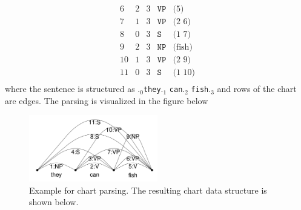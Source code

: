 \begin{itemize}
$$\begin{array}{ccccc}
	6 & 2 & 3 & \texttt{VP} & \text{(5)}\\
	7 & 1 & 3 & \texttt{VP} & \text{(2 6)}\\
	8 & 0 & 3 & \texttt{S} & \text{(1 7)}\\
	9 & 2 & 3 & \texttt{NP} & \text{(fish)}\\
	10 & 1 & 3 & \texttt{VP} & \text{(2 9)}\\
	11 & 0 & 3 & \texttt{S} & \text{(1 10)}\\
	\end{array}$$
	where the sentence is structured as $._0$\texttt{they}$._1$ \texttt{can}$._2$ \texttt{fish}$._3$ and rows of the chart are edges. The parsing is visualized in the figure below
	\begin{figure}[ht]
		\centering
		\includegraphics[width=0.5\textwidth]{figures/chart_parsing_structure.png}
		\caption{Example for chart parsing. The resulting chart data structure is shown below.}
		\label{fig:chart_parsing_structure}
	\end{figure}
\end{itemize}
